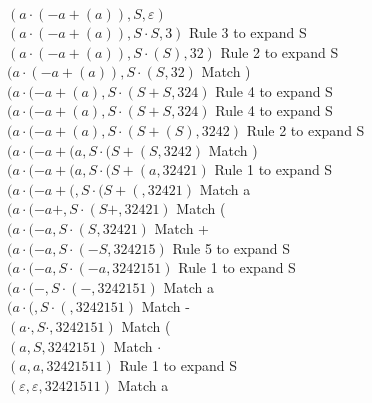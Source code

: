 \noindent $(a \cdot (-a + (a)), S, \varepsilon)$ \\
$(a \cdot (-a + (a)), S \cdot S, 3)$ Rule 3 to expand S \\
$(a \cdot (-a + (a)), S \cdot (S), 32)$ Rule 2 to expand S \\
$(a \cdot (-a + (a)), S \cdot (S, 32)$ Match )  \\
$(a \cdot (-a + (a), S \cdot (S+S, 324)$ Rule 4 to expand S \\
$(a \cdot (-a + (a), S \cdot (S+S, 324)$ Rule 4 to expand S \\
$(a \cdot (-a + (a), S \cdot (S+(S), 3242)$ Rule 2 to expand S \\
$(a \cdot (-a + (a, S \cdot (S+(S, 3242)$ Match ) \\
$(a \cdot (-a + (a, S \cdot (S+(a, 32421)$ Rule 1 to expand S \\
$(a \cdot (-a + (, S \cdot (S+(, 32421)$ Match a \\
$(a \cdot (-a + , S \cdot (S+, 32421)$ Match ( \\
$(a \cdot (-a , S \cdot (S, 32421)$ Match + \\
$(a \cdot (-a , S \cdot (-S, 324215)$ Rule 5 to expand S \\
$(a \cdot (-a , S \cdot (-a, 3242151)$ Rule 1 to expand S \\
$(a \cdot (- , S \cdot (-, 3242151)$ Match a \\
$(a \cdot ( , S \cdot (, 3242151)$ Match - \\
$(a \cdot  , S \cdot , 3242151)$ Match ( \\
$(a, S, 3242151)$ Match $\cdot$ \\
$(a, a, 32421511)$ Rule 1 to expand S \\
$(\varepsilon, \varepsilon, 32421511)$ Match a \\